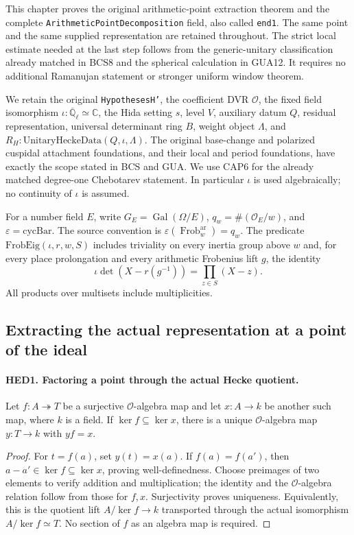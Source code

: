 \documentclass[11pt,a4paper]{article}
\numberwithin{equation}{section}
\theoremstyle{remark}\newtheorem{remark}[theorem]{Remark}
\begin{document}
This chapter proves the original arithmetic-point extraction theorem and
the complete \texttt{Arithmetic\allowbreak Point\allowbreak Decomposition} field, also called
\texttt{end1}.  The same point and the same supplied representation are
retained throughout.  The strict local estimate needed at the last step
follows from the generic-unitary classification already matched in BCS8
and the spherical calculation in GUA12.  It requires no additional
Ramanujan statement or stronger uniform window theorem.

We retain the original \texttt{Hypotheses\allowbreak H'}, the coefficient DVR
\(\mathcal O\), the fixed field isomorphism
\(\iota:\overline{\mathbb Q}_\ell\simeq\mathbb C\), the Hida setting
\(s\), level \(V\), auxiliary datum \(Q\), residual representation,
universal determinant ring \(B\), weight object \(\Lambda\), and
\(R_H:\mathrm{UnitaryHeckeData}(Q,\iota,\Lambda)\).
The original base-change and polarized cuspidal attachment foundations,
and their local and period foundations, have exactly the scope stated
in BCS and GUA.  We use CAP6 for the already matched degree-one
Chebotarev statement.  In particular \(\iota\) is used algebraically;
no continuity of \(\iota\) is assumed.

For a number field \(E\), write \(G_E=\operatorname{Gal}(\Omega/E)\),
\(q_w=\#(\mathcal O_E/w)\), and \(\varepsilon=\mathrm{cycBar}\).
The source convention is
\(\varepsilon(\operatorname{Frob}^{\mathrm{ar}}_w)=q_w\).
The predicate \(\mathrm{FrobEig}(\iota,r,w,S)\) includes triviality
on every inertia group above \(w\) and, for every place prolongation
and every arithmetic Frobenius lift \(g\), the identity
\[
 \iota\det(X-r(g^{-1}))=\prod_{z\in S}(X-z).
 \tag{HED.1}
\]
All products over multisets include multiplicities.

\subsection{Extracting the actual representation at a point of the ideal}

\paragraph{HED1. Factoring a point through the actual Hecke quotient.}
\label{claim:HED1}
Let \(f:A\twoheadrightarrow T\) be a surjective \(\mathcal O\)-algebra
map and let \(x:A\to k\) be another such map, where \(k\) is a field.
If \(\ker f\subseteq\ker x\), there is a unique
\(\mathcal O\)-algebra map \(y:T\to k\) with \(y f=x\).
\begin{proof}
For \(t=f(a)\), set \(y(t)=x(a)\).  If \(f(a)=f(a')\), then
\(a-a'\in\ker f\subseteq\ker x\), proving well-definedness.
Choose preimages of two elements to verify addition and multiplication;
the identity and the \(\mathcal O\)-algebra relation follow from those
for \(f,x\).  Surjectivity proves uniqueness.  Equivalently, this is
the quotient lift \(A/\ker f\to k\) transported through the actual
isomorphism \(A/\ker f\simeq T\).  No section of \(f\) as an algebra
map is required.
\end{proof}
\end{document}
